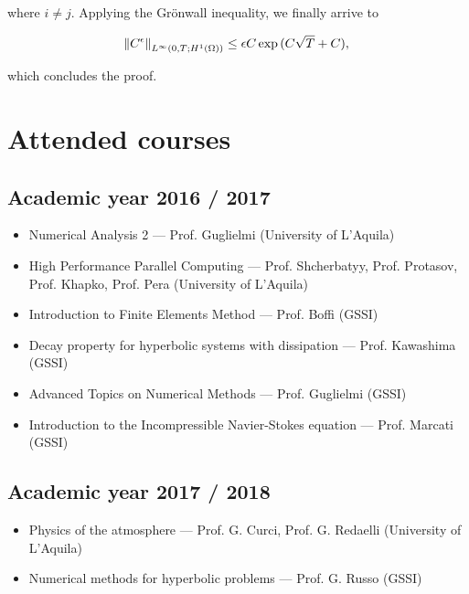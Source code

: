 \documentclass[11pt]{article}
\begin{document}
where $i \neq j.$ Applying the Gr\"onwall inequality, we finally arrive to

\[ \norm{C^\epsilon}_{L^\infty(0,T; H^1(\Omega))} \leq \epsilon C \exp{(C \sqrt{T} + C)},\]

which concludes the proof.

\newpage

\nocite{*}



\newpage

\section{Attended courses}

\subsection{Academic year 2016 / 2017}

\begin{itemize}

  \item Numerical Analysis 2 --- Prof. Guglielmi (University of L'Aquila)
  \item High Performance Parallel Computing --- Prof. Shcherbatyy, Prof. Protasov, Prof. Khapko, Prof. Pera (University of L'Aquila)
  \item Introduction to Finite Elements Method --- Prof. Boffi (GSSI)
  \item Decay property for hyperbolic systems with dissipation --- Prof. Kawashima (GSSI)
  \item Advanced Topics on Numerical Methods --- Prof. Guglielmi (GSSI)
  \item Introduction to the Incompressible Navier-Stokes equation --- Prof. Marcati (GSSI)

\end{itemize}

\subsection{Academic year 2017 / 2018}

\begin{itemize}

  \item Physics of the atmosphere --- Prof. G. Curci, Prof. G. Redaelli (University of L'Aquila)
  \item Numerical methods for hyperbolic problems --- Prof. G. Russo (GSSI)
  
\end{itemize}
\end{document}
